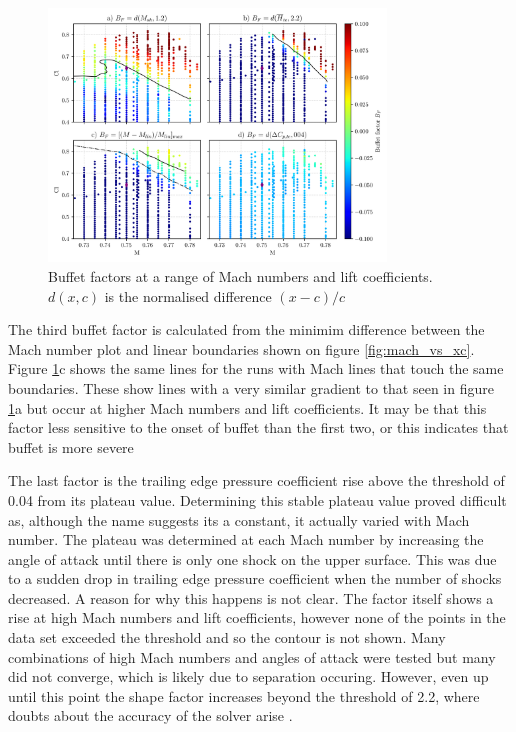 \documentclass{article}
\begin{document}
\begin{figure}[H]
    \centering
    \includegraphics[width=0.8\textwidth]{figures/buffet_classification.png}
    \caption{Buffet factors at a range of Mach numbers and lift coefficients. $d(x,c)$ is the normalised difference $(x-c)/c$}
    \label{fig:buffet_classification}
\end{figure}


The third buffet factor is calculated from the minimim difference between the Mach number plot and linear boundaries shown on figure \ref{fig:mach_vs_xc}.
Figure \ref{fig:buffet_classification}c shows the same lines for the runs with Mach lines that touch the same boundaries.
These show lines with a very similar gradient to that seen in figure \ref{fig:buffet_classification}a but occur at higher Mach numbers and lift coefficients.
It may be that this factor less sensitive to the onset of buffet than the first two, or this indicates that buffet is more severe 

The last factor is the trailing edge pressure coefficient rise above the threshold of 0.04 from its plateau value.
Determining this stable plateau value proved difficult as, although the name suggests its a constant, it actually varied with Mach number.
The plateau was determined at each Mach number by increasing the angle of attack until there is only one shock on the upper surface.
This was due to a sudden drop in trailing edge pressure coefficient when the number of shocks decreased.
A reason for why this happens is not clear.
The factor itself shows a rise at high Mach numbers and lift coefficients, however none of the points in the data set exceeded the threshold and so the contour is not shown.
Many combinations of high Mach numbers and angles of attack were tested but many did not converge, which is likely due to separation occuring.
However, even up until this point the shape factor increases beyond the threshold of 2.2, where doubts about the accuracy of the solver arise \cite{esdu}.
\end{document}
